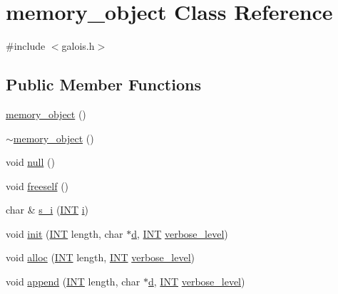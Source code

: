 \hypertarget{classmemory__object}{}\section{memory\+\_\+object Class Reference}
\label{classmemory__object}


{\ttfamily \#include $<$galois.\+h$>$}

\subsection*{Public Member Functions}
\begin{DoxyCompactItemize}
\item 
\mbox{\hyperlink{classmemory__object_a5465c06078f383cff3a663212db3385a}{memory\+\_\+object}} ()
\item 
\mbox{\hyperlink{classmemory__object_a9af084044507354ba7fcc5f28220a3a4}{$\sim$memory\+\_\+object}} ()
\item 
void \mbox{\hyperlink{classmemory__object_a9e538ffb790fddfebcf9557386af1e76}{null}} ()
\item 
void \mbox{\hyperlink{classmemory__object_aea989e6df86ed48049a2747df074b62a}{freeself}} ()
\item 
char \& \mbox{\hyperlink{classmemory__object_a8ab798c46f6f2c80176803d2fa930ba2}{s\+\_\+i}} (\mbox{\hyperlink{galois_8h_a09fddde158a3a20bd2dcadb609de11dc}{I\+NT}} \mbox{\hyperlink{alphabet2_8_c_acb559820d9ca11295b4500f179ef6392}{i}})
\item 
void \mbox{\hyperlink{classmemory__object_af3db8aaeacba976233f0f257a8678bdf}{init}} (\mbox{\hyperlink{galois_8h_a09fddde158a3a20bd2dcadb609de11dc}{I\+NT}} length, char $\ast$\mbox{\hyperlink{simeon_8_c_a4339ca06fa882e69473d37bd6d7917d1}{d}}, \mbox{\hyperlink{galois_8h_a09fddde158a3a20bd2dcadb609de11dc}{I\+NT}} \mbox{\hyperlink{simeon_8_c_a818073fbcc2f439e7c56952f67386122}{verbose\+\_\+level}})
\item 
void \mbox{\hyperlink{classmemory__object_a0768d510d8df4bed863435b637750185}{alloc}} (\mbox{\hyperlink{galois_8h_a09fddde158a3a20bd2dcadb609de11dc}{I\+NT}} length, \mbox{\hyperlink{galois_8h_a09fddde158a3a20bd2dcadb609de11dc}{I\+NT}} \mbox{\hyperlink{simeon_8_c_a818073fbcc2f439e7c56952f67386122}{verbose\+\_\+level}})
\item 
void \mbox{\hyperlink{classmemory__object_af27e1f0829bc6372b2a2632463bb267f}{append}} (\mbox{\hyperlink{galois_8h_a09fddde158a3a20bd2dcadb609de11dc}{I\+NT}} length, char $\ast$\mbox{\hyperlink{simeon_8_c_a4339ca06fa882e69473d37bd6d7917d1}{d}}, \mbox{\hyperlink{galois_8h_a09fddde158a3a20bd2dcadb609de11dc}{I\+NT}} \mbox{\hyperlink{simeon_8_c_a818073fbcc2f439e7c56952f67386122}{verbose\+\_\+level}})

\end{DoxyCompactItemize}
